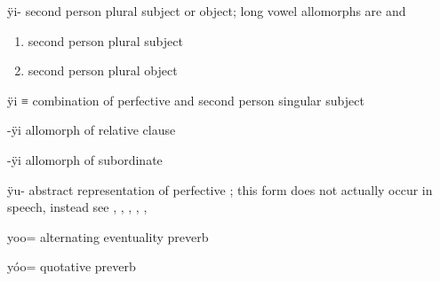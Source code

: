 \begin{morphdesc}[resume*=alphalist]
\item[ÿi-]\label{m:ÿi-}
	second person plural subject or object; long vowel allomorphs are  and 
	\begin{enumerate}
	\item	second person plural subject
	\item	second person plural object
	\end{enumerate}

\item[ÿi]
	≡ 
	combination of perfective  and
		second person singular subject 

\item[-ÿi]\label{m:-ÿi-rel}
	allomorph of relative clause 

\item[-ÿi]\label{m:-ÿi-sub}
	allomorph of subordinate 

\item[ÿu-]\label{m:ÿu-}
	abstract representation of perfective ;
	this form does not actually occur in speech, instead see
		, , ,  , , 

\item[yoo=]
	alternating eventuality preverb

\item[yóo=]
	quotative preverb

\end{morphdesc}

